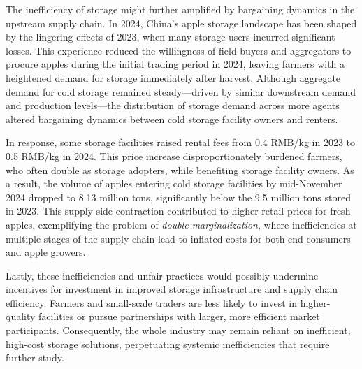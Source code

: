 The inefficiency of storage might further amplified by bargaining dynamics in the upstream supply chain. In 2024, China's apple storage landscape has been shaped by the lingering effects of 2023, when many storage users incurred significant losses. This experience reduced the willingness of field buyers and aggregators to procure apples during the initial trading period in 2024, leaving farmers with a heightened demand for storage immediately after harvest. Although aggregate demand for cold storage remained steady—driven by similar downstream demand and production levels—the distribution of storage demand across more agents altered bargaining dynamics between cold storage facility owners and renters.

In response, some storage facilities raised rental fees from 0.4 RMB/kg in 2023 to 0.5 RMB/kg in 2024. This price increase disproportionately burdened farmers, who often double as storage adopters, while benefiting storage facility owners. As a result, the volume of apples entering cold storage facilities by mid-November 2024 dropped to 8.13 million tons, significantly below the 9.5 million tons stored in 2023. This supply-side contraction contributed to higher retail prices for fresh apples, exemplifying the problem of \textit{double marginalization}, where inefficiencies at multiple stages of the supply chain lead to inflated costs for both end consumers and apple growers.

Lastly, these inefficiencies and unfair practices would possibly undermine incentives for investment in improved storage infrastructure and supply chain efficiency. Farmers and small-scale traders are less likely to invest in higher-quality facilities or pursue partnerships with larger, more efficient market participants. Consequently, the whole industry may remain reliant on inefficient, high-cost storage solutions, perpetuating systemic inefficiencies that require further study.




